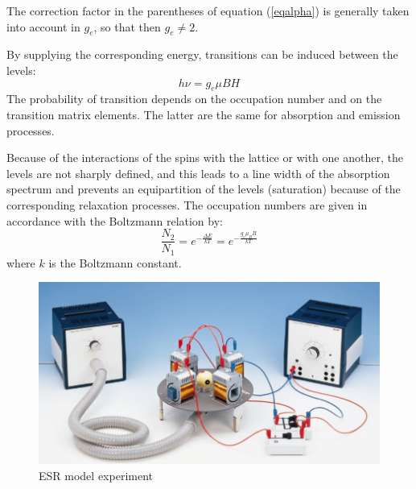 \documentclass[%
 reprint,
nofootinbib,
 amsmath,amssymb,
 aps,
floatfix,
]{revtex4-2}
\begin{document}
    The correction factor in the parentheses of equation (\ref{eqalpha}) is generally taken into account in $g_e$, so that then $g_e \neq 2$.
    \par
    By supplying the corresponding energy, transitions can be induced between the levels:
    \begin{equation}
    \label{eqge}
        h \nu = g_e \mu B H
    \end{equation}
    The probability of transition depends on the occupation number and on the transition matrix elements. The latter are the same for absorption and emission processes.
    \par
    Because of the interactions of the spins with the lattice or with one another, the levels are not sharply defined, and this leads to a line width of the absorption spectrum and prevents an equipartition of the levels (saturation) because of the corresponding relaxation processes. The occupation numbers are given in accordance with the Boltzmann relation by:
    \begin{equation}
        \dfrac{N_2}{N_1} = e^{- \frac{\Delta E}{kT}} = e^{- \frac{g_e \mu_B B}{kT}}
    \end{equation}
    where $k$ is the Boltzmann constant.
    \begin{figure}
        \centering
        \includegraphics[scale = 0.9]{Figures/esrmodelexpt.png}
        \caption{ESR model experiment}
        \label{fig:my_label}
    \end{figure}
    
    
\end{document}
